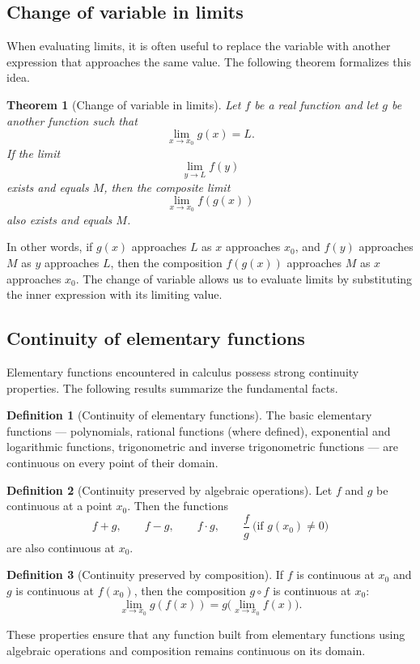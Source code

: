 \documentclass[11pt,a4paper]{article}
\theoremstyle{definition} \newtheorem{definition}{Definition} \theoremstyle{plain} \newtheorem{theorem}{Theorem}
\begin{document}
\subsection{Change of variable in limits}
When evaluating limits, it is often useful to replace the variable with another expression that approaches the same value.
The following theorem formalizes this idea.
\begin{theorem}[Change of variable in limits]\label{thm:change-variable-limits} Let $f$ be a real function and let $g$ be another function such that
\[ \lim_{x \to x_0} g(x) = L. \]
If the limit
\[ \lim_{y \to L} f(y) \]
exists and equals $M$, then the composite limit
\[ \lim_{x \to x_0} f(g(x)) \]
also exists and equals $M$. \end{theorem}
In other words, if $g(x)$ approaches $L$ as $x$ approaches $x_0$, and $f(y)$ approaches $M$ as $y$ approaches $L$, then the composition $f(g(x))$ approaches $M$ as $x$ approaches $x_0$.
The change of variable allows us to evaluate limits by substituting the inner expression with its limiting value.
\subsection{Continuity of elementary functions}
Elementary functions encountered in calculus possess strong continuity properties.
The following results summarize the fundamental facts.
\begin{definition}[Continuity of elementary functions] The basic elementary functions --- polynomials, rational functions (where defined), exponential and logarithmic functions, trigonometric and inverse trigonometric functions --- are continuous on every point of their domain. \end{definition}
\begin{definition}[Continuity preserved by algebraic operations] Let $f$ and $g$ be continuous at a point $x_0$.
Then the functions
\[ f+g,\qquad f-g,\qquad f\cdot g,\qquad \frac{f}{g}\ \text{(if } g(x_0)\ne 0) \]
are also continuous at $x_0$. \end{definition}
\begin{definition}[Continuity preserved by composition] If $f$ is continuous at $x_0$ and $g$ is continuous at $f(x_0)$, then the composition $g\circ f$ is continuous at $x_0$:
\[ \lim_{x\to x_0} g(f(x)) = g\bigl(\lim_{x\to x_0} f(x)\bigr). \]
\end{definition}
These properties ensure that any function built from elementary functions using algebraic operations and composition remains continuous on its domain.
\end{document}
